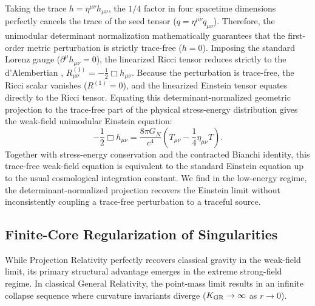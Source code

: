 \documentclass[11pt]{article}
\begin{document}
Taking the trace $h = \eta^{\mu\nu}h_{\mu\nu}$, the $1/4$ factor in four spacetime dimensions perfectly cancels the trace of the seed tensor ($q = \eta^{\mu\nu}q_{\mu\nu}$). Therefore, the unimodular determinant normalization mathematically guarantees that the first-order metric perturbation is strictly trace-free ($h=0$). Imposing the standard Lorenz gauge ($\partial^\mu h_{\mu\nu} = 0$), the linearized Ricci \cite{Ricci1900} tensor reduces strictly to the d'Alembertian \cite{courant1962methods,   dalembert1747recherches}, $R_{\mu\nu}^{(1)} = -\frac{1}{2}\Box h_{\mu\nu}$. Because the perturbation is trace-free, the Ricci scalar vanishes ($R^{(1)} = 0$), and the linearized Einstein tensor equates directly to the Ricci tensor. Equating this determinant-normalized geometric projection to the trace-free part of the physical stress-energy distribution gives the weak-field unimodular Einstein equation:
\begin{equation}
\boxed{-\frac12\Box h_{\mu\nu}= \frac{8\pi G_N}{c^4}
\left(T_{\mu\nu}-\frac14\eta_{\mu\nu}T\right).}
\end{equation}
Together with stress-energy conservation and the contracted Bianchi identity, this trace-free weak-field equation is equivalent to the standard Einstein equation up to the usual cosmological integration constant. We find in the low-energy regime, the determinant-normalized projection recovers the Einstein limit without inconsistently coupling a trace-free perturbation to a traceful source.

\subsection{Finite-Core Regularization of Singularities}
\label{sec:finite_core_regularization}

While Projection Relativity perfectly recovers classical gravity in the weak-field limit, its primary structural advantage emerges in the extreme strong-field regime. In classical General Relativity, the point-mass limit results in an infinite collapse \cite{penrose1965} sequence where curvature invariants diverge ($K_{\rm GR} \to \infty$ as $r \to 0$). 
\end{document}
